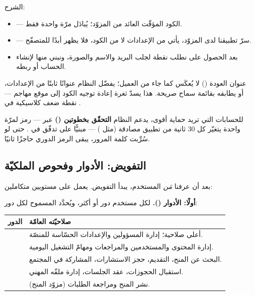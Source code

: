 الشرح:
\begin{itemize}
\item \code{["code"]} — الكود المؤقّت العائد من المزوّد؛ يُبادَل مرّة واحدة فقط.
\item {} — سرّ تطبيقنا لدى المزوّد، يأتي من الإعدادات لا من
  الكود، فلا يظهر أبدًا للمتصفّح.
\item بعد الحصول على  نطلب نقطة  لجلب البريد والاسم
  والصورة، ونبني منها  لإنشاء الحساب أو ربطه.
\end{itemize}

\begin{secnote}
عنوان العودة () لا يُعكَس كما جاء من العميل؛ يفضّل النظام عنوانًا
ثابتًا من الإعدادات، أو يطابقه بقائمة سماح صريحة. هذا يسدّ ثغرة إعادة توجيه الكود إلى
موقع مهاجم — نقطة ضعف كلاسيكية في .
\end{secnote}

\begin{note}
للحسابات التي تريد حماية أقوى، يدعم النظام \textbf{التحقّق بخطوتين ()} عبر
 — رمز لمرّة واحدة يتغيّر كل 30 ثانية من تطبيق مصادقة (مثل ) — مبنيًّا على تدفّق  في . حتى لو
سُرِّبت كلمة المرور، يبقى الرمز الدوري حاجزًا ثانيًا.
\end{note}

\subsection{التفويض: الأدوار وفحوص الملكيّة}

بعد أن عرفنا \emph{مَن} المستخدم، يبدأ التفويض. يعمل على مستويين متكاملين:

\textbf{أولًا: الأدوار ().} لكل مستخدم دور أو أكثر، ويُحدَّد المسموح لكل دور:

\begin{center}
\begin{tabular}{L{3.4cm} L{11.3cm}}
\toprule
\textbf{\color{spPrimary}الدور} & \textbf{\color{spPrimary}صلاحيّته العامّة} \\
\midrule
{} & أعلى صلاحية؛ إدارة المسؤولين والإعدادات الحسّاسة للمنصّة. \\
 & إدارة المحتوى والمستخدمين والمراجعات ومهامّ التشغيل اليومية. \\
 & البحث عن المنح، التقديم، حجز الاستشارات، المشاركة في المجتمع. \\
 & استقبال الحجوزات، عقد الجلسات، إدارة ملفّه المهني. \\
 & نشر المنح ومراجعة الطلبات (مزوّد المنح). \\
\bottomrule
\end{tabular}
\end{center}

